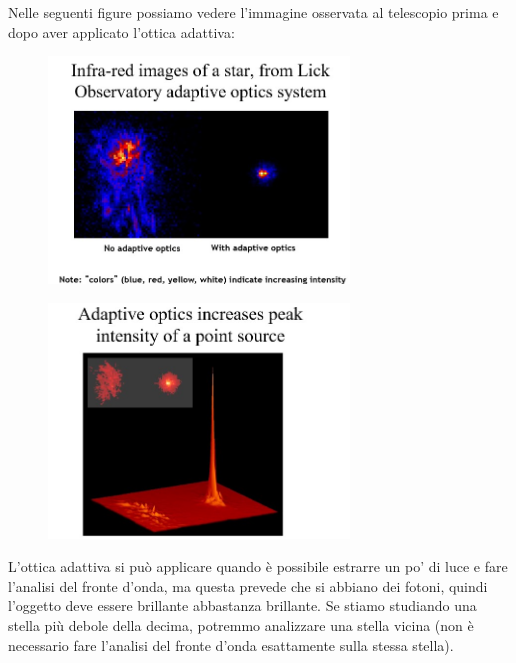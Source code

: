 Nelle seguenti figure possiamo vedere l'immagine osservata al telescopio prima e dopo aver applicato l'ottica adattiva:

\begin{minipage}{0.5\textwidth}
    \begin{figure}[H]
        \centering
        \includegraphics[width=8cm]{23.jpg}
    \end{figure}    
\end{minipage}
\begin{minipage}{0.5\textwidth}
    \begin{figure}[H]
        \centering
        \includegraphics[width=8cm]{24.jpg}
    \end{figure}
\end{minipage}

\vspace{0.2cm}L'ottica adattiva si può applicare quando è possibile estrarre un po' di luce e fare l'analisi del fronte d'onda, ma questa prevede che si abbiano dei fotoni, quindi l'oggetto deve essere brillante abbastanza brillante. Se stiamo studiando una stella più debole della decima, potremmo analizzare una stella vicina (non è necessario fare l'analisi del fronte d'onda esattamente sulla stessa stella).

